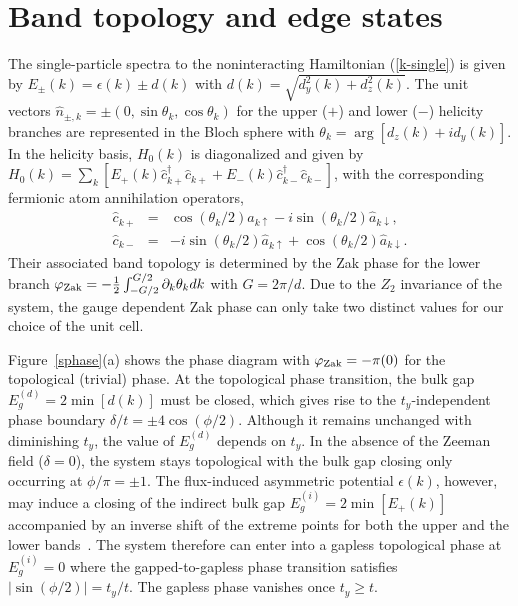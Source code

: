 \documentclass[twocolumn,prl,superscriptaddress,amsmath,amssymb]{revtex4} %
\begin{document}
\section{Band topology and edge states}\label{edge}
The single-particle spectra to the noninteracting Hamiltonian (\ref{k-single}) is given by $E_{\pm}({k}) =\epsilon({k}) \pm d(k)$ with $d(k)=\sqrt{d^2_y({k})+d^2_z({k})}$. The unit vectors $\hat{n}_{\pm,k} = \pm(0,\sin\theta_k,\cos\theta_k)$ for the upper ($+$) and lower ($-$) helicity branches are represented in the Bloch sphere
with $\theta_k=\arg[d_z(k)+id_y(k)]$. In the helicity basis, $H_{0}({{k}})$ is diagonalized and given by $H_{0}({{k}}) = \sum_{k}[E_{+}({k}) \hat{c}^\dag_{k+}\hat{c}_{k+}+E_{-}({k}) \hat{c}^\dag_{k-}\hat{c}_{k-}]$, with the corresponding fermionic atom annihilation operators,
\begin{eqnarray}
\hat{c}_{k+}&=& \cos(\theta_k/2) \hat{a}_{k\uparrow} -
i\sin(\theta_k/2) \hat{a}_{k\downarrow}, \nonumber \\
\hat{c}_{k-}&=& -i\sin(\theta_k/2) \hat{a}_{k\uparrow} +
\cos(\theta_k/2) \hat{a}_{k\downarrow}.
\label{helicity}
\end{eqnarray}
Their associated band topology is determined by the Zak phase for the lower branch $\varphi_{\rm{Zak}} =-\frac{1}{2}\int_{-G/2}^{G/2} \partial_k \theta_k dk$ with $G=2\pi/d$. Due to the $Z_2$ invariance of the system, the gauge dependent Zak phase can only take two distinct values for our choice of the unit cell.

Figure~\ref{sphase}(a) shows the phase diagram with $\varphi_{\rm{Zak}}=-\pi(0)$ for the topological (trivial) phase. At the topological phase transition, the bulk gap $E_{g}^{(d)}=2\min[d({k})]$ must be closed, which gives rise to the $t_y$-independent phase boundary $\delta/t=\pm 4\cos(\phi/2)$. Although it remains unchanged with diminishing $t_y$, the value of $E_{g}^{(d)}$ depends on $t_y$. In the absence of the Zeeman field ($\delta=0$), the system stays topological with the bulk gap closing only occurring at $\phi/\pi=\pm1$. The flux-induced asymmetric potential $\epsilon({k})$, however, may induce a closing of the indirect bulk gap $E_{g}^{(i)}=2\min[E_+(k)]$ accompanied by an inverse shift of the extreme points for both the upper and the lower bands~\cite{Deng2016}. The system therefore can enter into a gapless topological phase at $E_{g}^{(i)}=0$ where the gapped-to-gapless phase transition satisfies $|\sin(\phi/2)|=t_{y}/t$. The gapless phase vanishes once $t_{y}\geq t$.
\end{document}
